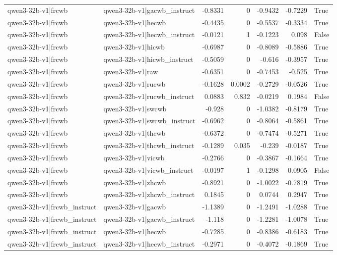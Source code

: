 \begin{table}
\begin{tabular}{l l r r r r l}
qwen3-32b-v1|frcwb & qwen3-32b-v1|gacwb_instruct & -0.8331 & 0 & -0.9432 & -0.7229 & True \\
qwen3-32b-v1|frcwb & qwen3-32b-v1|hecwb & -0.4435 & 0 & -0.5537 & -0.3334 & True \\
qwen3-32b-v1|frcwb & qwen3-32b-v1|hecwb_instruct & -0.0121 & 1 & -0.1223 & 0.098 & False \\
qwen3-32b-v1|frcwb & qwen3-32b-v1|hicwb & -0.6987 & 0 & -0.8089 & -0.5886 & True \\
qwen3-32b-v1|frcwb & qwen3-32b-v1|hicwb_instruct & -0.5059 & 0 & -0.616 & -0.3957 & True \\
qwen3-32b-v1|frcwb & qwen3-32b-v1|raw & -0.6351 & 0 & -0.7453 & -0.525 & True \\
qwen3-32b-v1|frcwb & qwen3-32b-v1|rucwb & -0.1628 & 0.0002 & -0.2729 & -0.0526 & True \\
qwen3-32b-v1|frcwb & qwen3-32b-v1|rucwb_instruct & 0.0883 & 0.832 & -0.0219 & 0.1984 & False \\
qwen3-32b-v1|frcwb & qwen3-32b-v1|swcwb & -0.928 & 0 & -1.0382 & -0.8179 & True \\
qwen3-32b-v1|frcwb & qwen3-32b-v1|swcwb_instruct & -0.6962 & 0 & -0.8064 & -0.5861 & True \\
qwen3-32b-v1|frcwb & qwen3-32b-v1|thcwb & -0.6372 & 0 & -0.7474 & -0.5271 & True \\
qwen3-32b-v1|frcwb & qwen3-32b-v1|thcwb_instruct & -0.1289 & 0.035 & -0.239 & -0.0187 & True \\
qwen3-32b-v1|frcwb & qwen3-32b-v1|vicwb & -0.2766 & 0 & -0.3867 & -0.1664 & True \\
qwen3-32b-v1|frcwb & qwen3-32b-v1|vicwb_instruct & -0.0197 & 1 & -0.1298 & 0.0905 & False \\
qwen3-32b-v1|frcwb & qwen3-32b-v1|zhcwb & -0.8921 & 0 & -1.0022 & -0.7819 & True \\
qwen3-32b-v1|frcwb & qwen3-32b-v1|zhcwb_instruct & 0.1845 & 0 & 0.0744 & 0.2947 & True \\
qwen3-32b-v1|frcwb_instruct & qwen3-32b-v1|gacwb & -1.1389 & 0 & -1.2491 & -1.0288 & True \\
qwen3-32b-v1|frcwb_instruct & qwen3-32b-v1|gacwb_instruct & -1.118 & 0 & -1.2281 & -1.0078 & True \\
qwen3-32b-v1|frcwb_instruct & qwen3-32b-v1|hecwb & -0.7285 & 0 & -0.8386 & -0.6183 & True \\
qwen3-32b-v1|frcwb_instruct & qwen3-32b-v1|hecwb_instruct & -0.2971 & 0 & -0.4072 & -0.1869 & True \\

\end{tabular}
\end{table}
